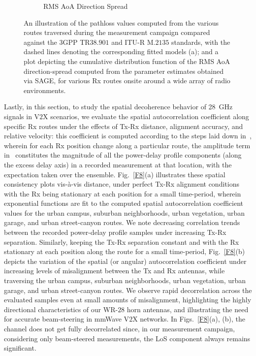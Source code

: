 \documentclass[12pt, draftcls, onecolumn]{IEEEtran}
\begin{document}
\begin{figure} [t]
\begin{subfigure}{0.505\linewidth}
         \caption{RMS AoA Direction Spread}
         \label{F7b}
     \end{subfigure}
     \vspace{-2mm}
     \caption{An illustration of the pathloss values computed from the various routes traversed during the measurement campaign compared against the $3$GPP TR$38.901$ and ITU-R M.$2135$ standards, with the dashed lines denoting the corresponding fitted models (a); and a plot depicting the cumulative distribution function of the RMS AoA direction-spread computed from the parameter estimates obtained via SAGE, for various Rx routes onsite around a wide array of radio environments.}
     \label{F7}
\end{figure}

Lastly, in this section, to study the spatial decoherence behavior of \SI{28}{\giga\hertz} signals in V$2$X scenarios, we evaluate the spatial autocorrelation coefficient along specific Rx routes under the effects of Tx-Rx distance, alignment accuracy, and relative velocity: this coefficient is computed according to the steps laid down in~\cite{MacCartneySpatialStatistics}, wherein for each Rx position change along a particular route, the amplitude term in~\cite{MacCartneySpatialStatistics} constitutes the magnitude of all the power-delay profile components (along the excess delay axis) in a recorded measurement at that location, with the expectation taken over the ensemble. Fig.~\ref{F8}(a) illustrates these spatial consistency plots vis-\`{a}-vis distance, under perfect Tx-Rx alignment conditions with the Rx being stationary at each position for a small time-period, wherein exponential functions are fit to the computed spatial autocorrelation coefficient values for the urban campus, suburban neighborhoods, urban vegetation, urban garage, and urban street-canyon routes. We note decreasing correlation trends between the recorded power-delay profile samples under increasing Tx-Rx separation. Similarly, keeping the Tx-Rx separation constant and with the Rx stationary at each position along the route for a small time-period, Fig.~\ref{F8}(b) depicts the variation of the spatial (or angular) autocorrelation coefficient under increasing levels of misalignment between the Tx and Rx antennas, while traversing the urban campus, suburban neighborhoods, urban vegetation, urban garage, and urban street-canyon routes. We observe rapid decorrelation across the evaluated samples even at small amounts of misalignment, highlighting the highly directional characteristics of our WR-$28$ horn antennas, and illustrating the need for accurate beam-steering in mmWave V$2$X networks. In Figs.~\ref{F8}(a), (b), the channel does not get fully decorrelated since, in our measurement campaign, considering only beam-steered measurements, the LoS component always remains significant.
\vspace{-3mm}
\end{document}

